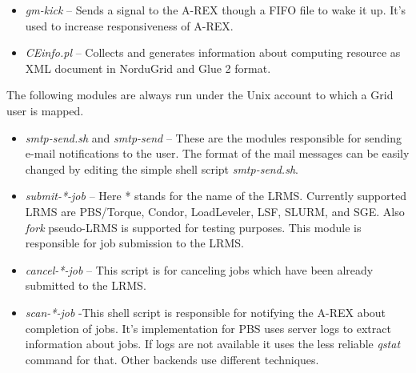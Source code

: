 \documentclass{article}                            %
\begin{document}


\begin{itemize}
\item \emph{gm-kick} -- Sends a signal to the A-REX though a FIFO file to
wake it up. It's used to increase responsiveness of A-REX.
\item \emph{CEinfo.pl} -- Collects and generates information about computing
resource as XML document in NorduGrid and Glue 2 format.
\end{itemize}

The following modules are always run under the Unix account to which
a Grid user is mapped.

\begin{itemize}
\item \textit{smtp-send.sh} and \textit{smtp-send} -- These are the modules
responsible for sending e-mail notifications to the user. The format
of the mail messages can be easily changed by editing the simple shell
script \textit{smtp-send.sh}. 
\item \textit{submit-{*}-job} -- Here {*} stands for the name of the LRMS.
Currently supported LRMS are PBS/Torque, Condor, LoadLeveler, LSF, SLURM,
and SGE. Also \emph{fork} pseudo-LRMS is supported for testing purposes.
This module is responsible for job submission to the LRMS.
\item \textit{cancel-{*}-job} -- This script is for canceling jobs which
have been already submitted to the LRMS.
\item \textit{scan-{*}-job} -This shell script is responsible for notifying
the A-REX about completion of jobs. It's implementation for PBS uses
server logs to extract information about jobs. If logs are not available
it uses the less reliable \emph{qstat} command for that. Other backends
use different techniques.
\end{itemize}
\end{document}
